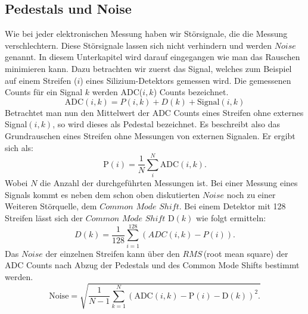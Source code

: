 \subsection{Pedestals und Noise}
Wie bei jeder elektronischen Messung haben wir Störsignale, die die Messung
verschlechtern. Diese Störsignale lassen sich nicht verhindern und werden $Noise$
genannt. In diesem Unterkapitel wird darauf eingegangen wie man das Rauschen
minimieren kann. Dazu betrachten wir zuerst das Signal, welches
zum Beispiel auf einem Streifen ($i$) eines Silizium-Detektors gemessen wird.
Die gemessenen Counts für ein Signal $k$ werden ADC($i,k$) Counts bezeichnet.
\begin{equation}
\label{ADC}
\text{ADC}(i,k)=P(i,k)+D(k)+\text{Signal}(i,k)
\end{equation}
Betrachtet man nun den Mittelwert der ADC Counts eines Streifen ohne externes Signal$(i,k)$,
so wird dieses als Pedestal bezeichnet. Es beschreibt also das Grundrauschen eines Streifen ohne
Messungen von externen Signalen. Er ergibt sich als:
\begin{equation}
    \label{peds}
    \text{P}(i)=\frac{1}{N}\sum_i^{N} \text{ADC}(i,k).
\end{equation}
Wobei $N$ die Anzahl der durchgeführten Messungen ist.
Bei einer Messung eines Signals kommt es neben dem schon oben diskutierten $Noise$
noch zu einer Weiteren Störquelle, dem $Common \,\,Mode \,\,Shift$. Bei einem Detektor mit
128 Streifen lässt sich der $Common \,\,Mode \,\,Shift\,\, \text{D}(k)$ wie folgt ermitteln:
\begin{equation}
    \label{common}
    D(k)=\frac{1}{128}\sum_{i=1}^{128}(ADC(i,k)-P(i)).
\end{equation}
Das $Noise$ der einzelnen Streifen kann über den $RMS\,$(root mean square)
der ADC Counts nach Abzug der Pedestals und des Common Mode Shifts bestimmt werden.
\begin{equation}
    \label{noise}
    \text{Noise}=\sqrt{\frac{1}{N-1}\sum_{k=1}^{N}( \text{ADC}(i,k)-\text{P}(i)-\text{D}(k))^2. }
\end{equation}
